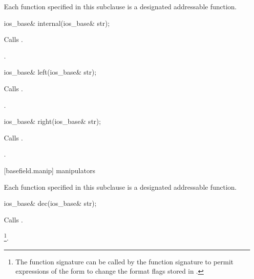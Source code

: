 \pnum
Each function specified in this subclause
is a designated addressable function.

%
\begin{itemdecl}
ios_base& internal(ios_base& str);
\end{itemdecl}

\begin{itemdescr}
\pnum
\effects
Calls
.

\pnum
\returns
{}.
\end{itemdescr}

%
\begin{itemdecl}
ios_base& left(ios_base& str);
\end{itemdecl}

\begin{itemdescr}
\pnum
\effects
Calls
.

\pnum
\returns
{}.
\end{itemdescr}

%
\begin{itemdecl}
ios_base& right(ios_base& str);
\end{itemdecl}

\begin{itemdescr}
\pnum
\effects
Calls
.

\pnum
\returns
{}.
\end{itemdescr}

[basefield.manip]{ manipulators}

\pnum
Each function specified in this subclause
is a designated addressable function.

%
\begin{itemdecl}
ios_base& dec(ios_base& str);
\end{itemdecl}

\begin{itemdescr}
\pnum
\effects
Calls
.

\pnum
\returns
{}\footnote{The function signature
can be called by
the function signature
to permit expressions of the form
to change the format flags stored in
.}.
\end{itemdescr}

